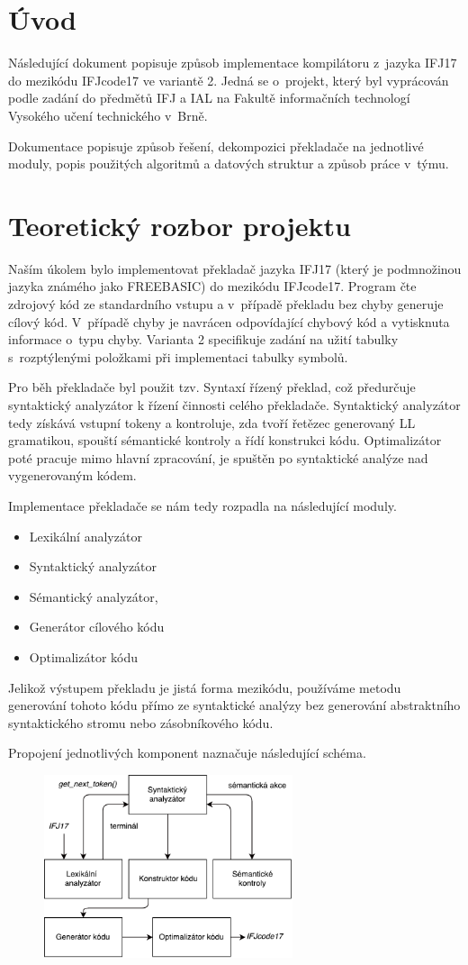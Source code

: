 \section{Úvod}
Následující dokument popisuje způsob implementace kompilátoru z~jazyka IFJ17 do mezikódu
IFJcode17 ve variantě 2. Jedná se o~projekt,
který byl vyprácován podle zadání do předmětů IFJ a IAL na Fakultě
informačních technologí Vysokého učení technického v~Brně.

Dokumentace popisuje způsob řešení, dekompozici překladače na jednotlivé moduly,
popis použitých algoritmů a datových struktur a způsob práce v~týmu.

\section{Teoretický rozbor projektu}
Naším úkolem bylo implementovat překladač jazyka IFJ17 (který je podmnožinou jazyka známého jako \mbox{FREEBASIC})
do mezikódu IFJcode17. Program čte zdrojový kód ze standardního vstupu a v~případě překladu bez chyby generuje cílový
kód. V~případě chyby je navrácen odpovídající chybový kód a vytisknuta informace o~typu chyby. Varianta 2 specifikuje
zadání na užití tabulky s~rozptýlenými položkami při implementaci tabulky symbolů.

Pro běh překladače byl použit tzv. Syntaxí řízený překlad, což předurčuje syntaktický analyzátor k řízení činnosti
celého překladače. Syntaktický analyzátor tedy získává vstupní tokeny a kontroluje, zda tvoří řetězec generovaný
LL gramatikou, spouští sémantické kontroly a řídí konstrukci kódu.
Optimalizátor poté pracuje mimo hlavní zpracování, je spuštěn po syntaktické analýze nad vygenerovaným kódem.

Implementace překladače se nám tedy rozpadla na následující moduly.

\begin{itemize}
    \item Lexikální analyzátor
    \item Syntaktický analyzátor
    \item Sémantický analyzátor,
    \item Generátor cílového kódu
    \item Optimalizátor kódu
\end{itemize}

Jelikož výstupem překladu je jistá forma mezikódu, používáme metodu generování tohoto kódu přímo ze syntaktické
analýzy bez generování abstraktního syntaktického stromu nebo zásobníkového kódu.

Propojení jednotlivých komponent naznačuje následující schéma.
\vspace*{4px}
\begin{figure}[htbp]
\centering
\includegraphics[width=0.65\textwidth, angle=0]{src/assets/structure.pdf}
\end{figure}